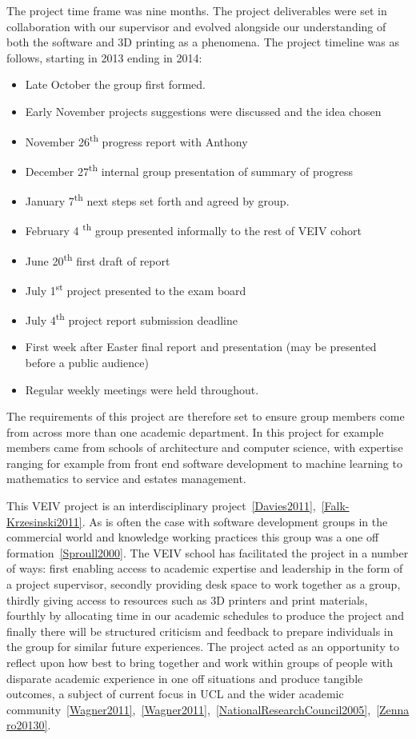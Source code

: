 \documentclass[11pt]{report} %
\begin{document}
The project time frame was nine months. The project deliverables were set in collaboration with our supervisor and evolved alongside our understanding of both the software and 3D printing as a phenomena. The project timeline was as follows, starting in 2013 ending in 2014:

\begin{itemize}
\item Late October the group first formed. 
\item Early November projects suggestions were discussed and the idea chosen 
\item November 26\textsuperscript{th} progress report with Anthony 
\item December 27\textsuperscript{th} internal group presentation of summary of progress 
\item January 7\textsuperscript{th} next steps set forth and agreed by group.
\item February 4 \textsuperscript{th} group presented informally to the rest of VEIV cohort 
\item June 20\textsuperscript{th} first draft of report 
\item July 1\textsuperscript{st} project presented to the exam board
\item July 4\textsuperscript{th} project report submission deadline 
\item First week after Easter final report and presentation (may be presented before a public audience)
\item Regular weekly meetings were held throughout. 
\end{itemize}

The requirements of this project are therefore set to ensure group members come from across more than one academic department. In this project for example members came from schools of architecture and computer science, with expertise ranging for example from front end software development to machine learning to mathematics to service and estates management. 

This VEIV project is an interdisciplinary project~\ref{Davies2011},~\ref{Falk-Krzesinski2011}. As is often the case with software development groups in the commercial world and knowledge working practices this group was a one off formation~\ref{Sproull2000}. The VEIV school has facilitated the project in a number of ways: first enabling access to academic expertise and leadership in the form of a project supervisor, secondly providing desk space to work together as a group, thirdly giving access to resources such as 3D printers and print materials, fourthly by allocating time in our academic schedules to produce the project and finally there will be structured criticism and feedback to prepare individuals in the group for similar future experiences. The project acted as an opportunity to reflect upon how best to bring together and work within groups of people with disparate academic experience in one off situations and produce tangible outcomes, a subject of current focus in UCL and the wider academic community~\ref{Wagner2011},~\ref{Wagner2011},~\ref{NationalResearchCouncil2005},~\ref{Zennaro20130}. 
\end{document}
